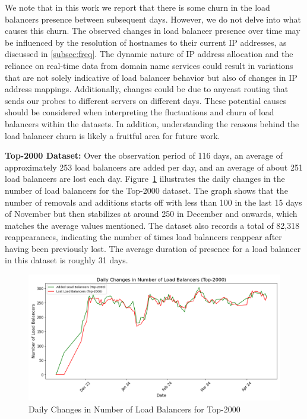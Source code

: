 \documentclass[12pt]{cwru_thesis}
\begin{document}
We note that in this work we report that there is some churn in
the load balancers presence between subsequent days.  However, we
do not delve into what causes this churn.  The observed changes
in load balancer presence over time may be influenced by the
resolution of hostnames to their current IP addresses, as
discussed in \ref{subsec:freq}. The dynamic nature of IP address
allocation and the reliance on real-time data from domain name
services could result in variations that are not solely
indicative of load balancer behavior but also of changes in IP
address mappings.  Additionally, changes could be due to anycast
routing that sends our probes to different servers on different
days.  These potential causes should be considered when
interpreting the fluctuations and churn of load balancers within
the datasets.  In addition, understanding the reasons behind the
load balancer churn is likely a fruitful area for future work.

\textbf{Top-2000 Dataset:} Over the observation period of 116 days, an average of approximately 253 load balancers are added per day, and an average of about 251 load balancers are lost each day. Figure~\ref{fig:top2000_changes} illustrates the daily changes in the number of load balancers for the Top-2000 dataset. The graph shows that the number of removals and additions starts off with less than 100 in the last 15 days of November but then stabilizes at around 250 in December and onwards, which matches the average values mentioned. The dataset also records a total of 82,318 reappearances, indicating the number of times load balancers reappear after having been previously lost. The average duration of presence for a load balancer in this dataset is roughly 31 days.

\begin{figure}[h!]
    \centering
    \includegraphics[width=\linewidth]{figures/load_balancer_changes_Top-2000.png}
    \caption{Daily Changes in Number of Load Balancers for Top-2000}
    \label{fig:top2000_changes}
\end{figure}
\end{document}
